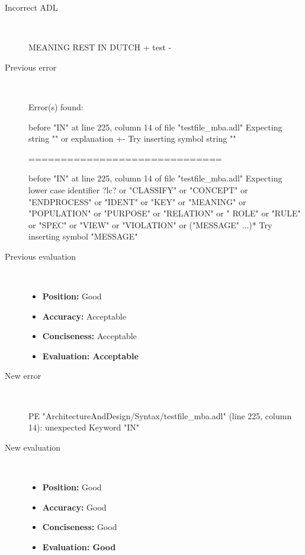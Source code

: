 \begin{description}
  \item[Incorrect ADL]~\\
\begin{adl}
MEANING REST IN DUTCH  {+ test -}\end{adl}
  \item[Previous error]~\\
\begin{haskell}
Error(s) found:

before "IN" at line 225, column 14 of file "testfile_mba.adl"
Expecting string "" or explanation {+-}
Try inserting symbol string ""

==============================

before "IN" at line 225, column 14 of file "testfile_mba.adl"
Expecting lower case identifier ?lc? or "CLASSIFY" or "CONCEPT" or "ENDPROCESS"
or "IDENT" or "KEY" or "MEANING" or "POPULATION" or "PURPOSE" or "RELATION" or "
ROLE" or "RULE" or "SPEC" or "VIEW" or "VIOLATION" or ("MESSAGE" ...)*
Try inserting symbol "MESSAGE"\end{haskell}
  \item[Previous evaluation]~\\
    \begin{itemize}
    \item \textbf{Position:} Good
    \item \textbf{Accuracy:} Acceptable
    \item \textbf{Conciseness:} Acceptable
    \item \textbf{Evaluation: Acceptable}
    \end{itemize}
  \item[New error]~\\
\begin{haskell}
PE "ArchitectureAndDesign/Syntax/testfile_mba.adl" (line 225, column 14):
unexpected Keyword "IN"\end{haskell}
  \item[New evaluation]~\\
    \begin{itemize}
    \item \textbf{Position:} Good
    \item \textbf{Accuracy:} Good
    \item \textbf{Conciseness:} Good
    \item \textbf{Evaluation: Good}
    \end{itemize}
  \end{description}

